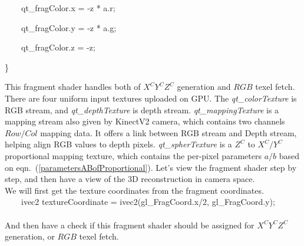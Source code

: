 \bigskip

{\ttfamily
\textcolor[rgb]{0.7529412,0.7529412,0.7529412}{\ \ \ \ }qt\_fragColor.x\textcolor[rgb]{0.7529412,0.7529412,0.7529412}{
} = \textcolor[rgb]{0.7529412,0.7529412,0.7529412}{
}{}-z\textcolor[rgb]{0.7529412,0.7529412,0.7529412}{
}*\textcolor[rgb]{0.7529412,0.7529412,0.7529412}{ }a.r;}

{\ttfamily
\textcolor[rgb]{0.7529412,0.7529412,0.7529412}{\ \ \ \ }qt\_fragColor.y\textcolor[rgb]{0.7529412,0.7529412,0.7529412}{
} = \textcolor[rgb]{0.7529412,0.7529412,0.7529412}{
}{}-z\textcolor[rgb]{0.7529412,0.7529412,0.7529412}{
}*\textcolor[rgb]{0.7529412,0.7529412,0.7529412}{ }a.g;}

{\ttfamily
\textcolor[rgb]{0.7529412,0.7529412,0.7529412}{\ \ \ \ }qt\_fragColor.z\textcolor[rgb]{0.7529412,0.7529412,0.7529412}{
} = \textcolor[rgb]{0.7529412,0.7529412,0.7529412}{ }{}-z;}

{\ttfamily
\}}

%
This fragment shader handles both of \(X^CY^CZ^C\) generation and \(RGB\) texel fetch. There are four uniform input textures uploaded on GPU. The \emph{qt\_colorTexture} is RGB stream, and \emph{qt\_depthTexture} is depth stream. \emph{qt\_mappingTexture} is a mapping stream also given by KinectV2 camera, which contains two channels \(Row/Col\) mapping data. It offers a link between RGB stream and Depth stream, helping align RGB values to depth pixels. \emph{qt\_spherTexture} is a  \(Z^C\) to \(X^C/Y^C\) proportional mapping texture, which contains the per-pixel parameters \(a/b\) based on eqn.~(\ref{parametersABofProportional}). Let's view the fragment shader step by step, and then have a view of the 3D reconstruction in camera space.%
\\\indent
We will first get the texture coordinates from the fragment coordinates.
\\
{\ttfamily
\textcolor[rgb]{0.7529412,0.7529412,0.7529412}{\ \ \ \  }\textcolor[rgb]{0.5019608,0.5019608,0.0}{ivec2 }\textcolor[rgb]{0.7529412,0.7529412,0.7529412}{
}textureCoordinate\textcolor[rgb]{0.7529412,0.7529412,0.7529412}{
}=\textcolor[rgb]{0.7529412,0.7529412,0.7529412}{
 }\textcolor[rgb]{0.5019608,0.5019608,0.0}{ivec2}(\textcolor[rgb]{0.5019608,0.0,0.5019608}{gl\_FragCoord}.x/\textcolor[rgb]{0.0,0.0,0.5019608}{2},\textcolor[rgb]{0.7529412,0.7529412,0.7529412}{
 }\textcolor[rgb]{0.5019608,0.0,0.5019608}{gl\_FragCoord}.y);}
\\\\
\noindent
And then have a check if this fragment shader should be assigned for \(X^CY^CZ^C\) generation, or \(RGB\) texel fetch.

